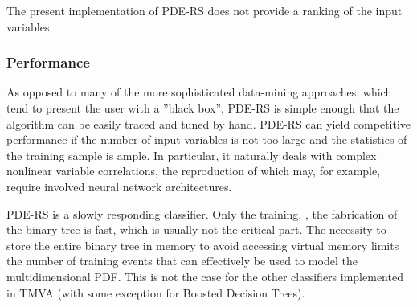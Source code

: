The present implementation of PDE-RS does not provide a ranking of 
the input variables.

\subsubsection{Performance}

As opposed to many of the more sophisticated data-mining approaches, which 
tend to present the user with a ''black box'', PDE-RS is simple enough that 
the algorithm can be easily traced and tuned by hand. PDE-RS can yield competitive 
performance if the number of input variables is not too large and the statistics
of the training sample is ample. In particular, it naturally deals with complex
nonlinear variable correlations, the reproduction of which may, for example, require
involved neural network architectures.

PDE-RS is a slowly responding classifier. Only the training, \ie, the fabrication 
of the binary tree is fast, which is usually not the critical part. 
The necessity to store the entire binary tree in memory to avoid accessing
virtual memory limits the number of training events that can effectively be 
used to model the multidimensional PDF. This is not the case for the other 
classifiers implemented in TMVA (with some exception for Boosted Decision Trees).

